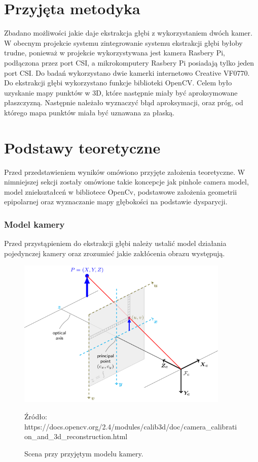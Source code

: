 \documentclass[oneside, eng]{mgr}
\begin{document}
\section{Przyjęta metodyka}
Zbadano możliwości jakie daje ekstrakcja głębi z wykorzystaniem dwóch kamer. W obecnym projekcie systemu zintegrowanie systemu ekstrakcji głębi byłoby trudne, ponieważ w projekcie wykorzystywana jest kamera Rasbery Pi, podłączona przez port CSI, a mikrokomputery Rasbery Pi posiadają tylko jeden port CSI. Do badań wykorzystano dwie kamerki internetowo Creative VF0770. Do ekstrakcji głębi wykorzystano funkcje biblioteki OpenCV. Celem było uzyskanie mapy punktów w 3D, które następnie miały być aproksymowane płaszczyzną. Następnie należało wyznaczyć błąd aproksymacji, oraz próg, od którego mapa punktów miała być uznawana za płaską.

\section{Podstawy teoretyczne}

Przed przedstawieniem wyników omówiono przyjęte założenia teoretyczne. W nimniejszej sekcji zostały omówione takie koncepcje jak pinhole camera model, model zniekształceń w bibliotece OpenCv, podstawowe założenia geometrii epipolarnej oraz wyznaczanie mapy głębokości na podstawie dysparycji.

\subsubsection{Model kamery}
Przed przystąpieniem do ekstrakcji głębi należy ustalić model działania pojedynczej kamery oraz zrozumieć jakie zakłócenia obrazu występują.

\begin{figure}
\centering
	\includegraphics[width=0.90\textwidth]{pinhole_camera_model.png}\par\vspace{1cm}
\caption{Scena przy przyjętym modelu kamery.}
Źródło: https://docs.opencv.org/2.4/modules/calib3d/doc/camera\_calibration\_and\_3d\_reconstruction.html
	\label{fig:camera_model}
\end{figure}
\end{document}
